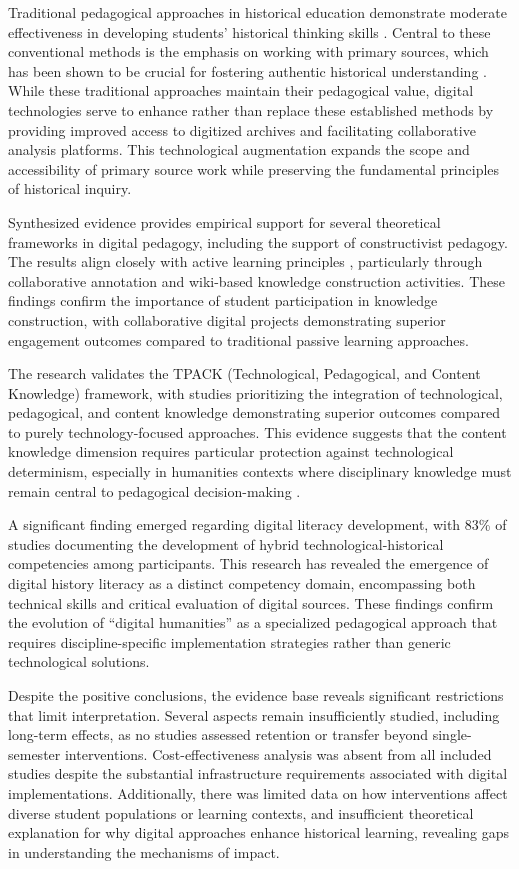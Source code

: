 \documentclass[
hf,
]{ceurart}
\begin{document}
Traditional pedagogical approaches in historical education demonstrate moderate effectiveness in developing students' historical thinking skills \cite{MonteSano2012}. Central to these conventional methods is the emphasis on working with primary sources, which has been shown to be crucial for fostering authentic historical understanding \cite{reisman2012}. While these traditional approaches maintain their pedagogical value, digital technologies serve to enhance rather than replace these established methods by providing improved access to digitized archives and facilitating collaborative analysis platforms. This technological augmentation expands the scope and accessibility of primary source work while preserving the fundamental principles of historical inquiry.

Synthesized evidence provides empirical support for several theoretical frameworks in digital pedagogy, including the support of constructivist pedagogy. The results align closely with active learning principles \cite{bonwell1991}, particularly through collaborative annotation and wiki-based knowledge construction activities. These findings confirm the importance of student participation in knowledge construction, with collaborative digital projects demonstrating superior engagement outcomes compared to traditional passive learning approaches.

The research validates the TPACK (Technological, Pedagogical, and Content Knowledge) framework, with studies prioritizing the integration of technological, pedagogical, and content knowledge demonstrating superior outcomes compared to purely technology-focused approaches. This evidence suggests that the content knowledge dimension requires particular protection against technological determinism, especially in humanities contexts where disciplinary knowledge must remain central to pedagogical decision-making \cite{Koh2013}.

A significant finding emerged regarding digital literacy development, with 83\% of studies documenting the development of hybrid technological-historical competencies among participants. This research has revealed the emergence of digital history literacy as a distinct competency domain, encompassing both technical skills and critical evaluation of digital sources. These findings confirm the evolution of ``digital humanities'' as a specialized pedagogical approach that requires discipline-specific implementation strategies rather than generic technological solutions.

Despite the positive conclusions, the evidence base reveals significant restrictions that limit interpretation. Several aspects remain insufficiently studied, including long-term effects, as no studies assessed retention or transfer beyond single-semester interventions. Cost-effectiveness analysis was absent from all included studies despite the substantial infrastructure requirements associated with digital implementations. Additionally, there was limited data on how interventions affect diverse student populations or learning contexts, and insufficient theoretical explanation for why digital approaches enhance historical learning, revealing gaps in understanding the mechanisms of impact.
\end{document}
